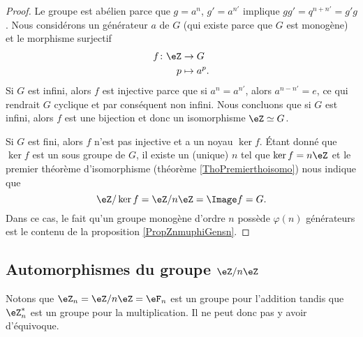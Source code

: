 \begin{proof}
    Le groupe est abélien parce que $g=a^n$, \( g'=a^{n'}\) implique \( gg'=q^{n+n'}=g'g\). Nous considérons un générateur \( a\) de \( G\) (qui existe parce que $G$ est monogène) et le morphisme surjectif
    \begin{equation}
        \begin{aligned}
            f\colon \eZ&\to G \\
            p&\mapsto a^p. 
        \end{aligned}
    \end{equation}
    Si \( G\) est infini, alors \( f\) est injective parce que si \( a^n=a^{n'}\), alors \( a^{n-n'}=e\), ce qui rendrait \( G\) cyclique et par conséquent non infini. Nous concluons que si \( G\) est infini, alors \( f\) est une bijection et donc un isomorphisme \( \eZ\simeq G\).

    Si \( G\) est fini, alors \( f\) n'est pas injective et a un noyau \( \ker f\). Étant donné que \( \ker f\) est un sous groupe de \( G\), il existe un (unique) \( n\) tel que \( \ker f=n\eZ\) et le premier théorème d'isomorphisme (théorème \ref{ThoPremierthoisomo}) nous indique que
    \begin{equation}
        \eZ/\ker f=\eZ/n\eZ=\Image f=G.
    \end{equation}
    Dans ce cas, le fait qu'un groupe monogène d'ordre \( n\) possède \( \varphi(n)\) générateurs est le contenu de la proposition \ref{PropZnmuphiGensn}.
\end{proof}

\subsection{Automorphismes du groupe $\eZ/n\eZ$}

Notons que \( \eZ_n=\eZ/n\eZ=\eF_n\) est un groupe pour l'addition tandis que \( \eZ_n^*\) est un groupe pour la multiplication. Il ne peut donc pas y avoir d'équivoque.

